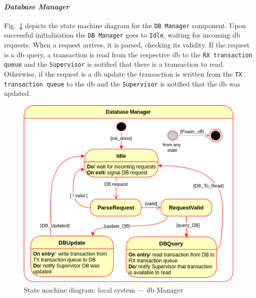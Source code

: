 \paragraph{\emph{Database Manager}}
Fig.~\ref{fig:state-mach-local-db} depicts the state machine diagram for the
\texttt{DB Manager} component. Upon successful initialization the
\texttt{DB Manager} goes to \texttt{Idle}, waiting for incoming \gls{db}
requests.
When a request arrives, it is parsed, checking its validity. If the request is a
\gls{db} query, a transaction is read from the respective \gls{db} to the
\texttt{RX transaction queue} and the \texttt{Supervisor} is notified that there
is a transaction to read. Otherwise, if the request is a \gls{db} update
the transaction is written from the \texttt{TX transaction queue} to the
\gls{db} and the \texttt{Supervisor} is notified that the \gls{db} was updated.
%
\begin{figure}[htb!]
\centering
    \includegraphics[width=0.6\columnwidth]{./img/state-mach-local-db.png}
  \caption{State machine diagram: local system --- \gls{db} Manager}%
\label{fig:state-mach-local-db}
\end{figure}
%
%
